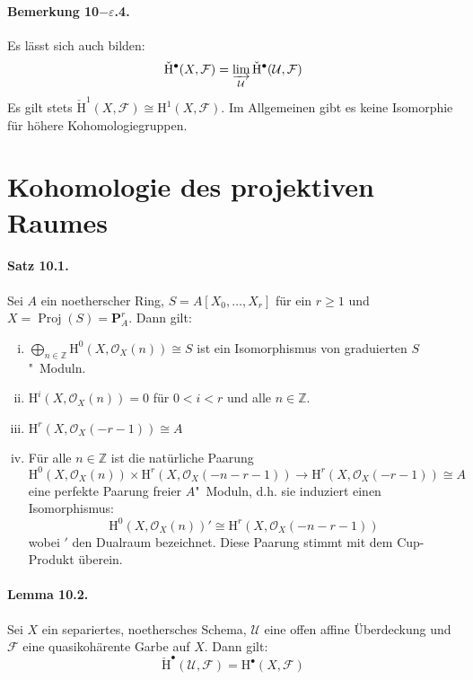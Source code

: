 \paragraph{Bemerkung 10$-\varepsilon$.4.}\label{9.5.4} Es lässt sich auch bilden:
\[\check{\mathrm{H}}^\bullet(X,\mathcal{F}) = \varinjlim_{\mathcal{U}}\check{\mathrm{H}}^\bullet(\mathcal{U},\mathcal{F}) \]
Es gilt stets $\check{\mathrm{H}}^1(X,\mathcal{F})\cong \mathrm{H}^1(X,\mathcal{F})$. Im Allgemeinen gibt es keine Isomorphie für höhere Kohomologiegruppen.

\section{Kohomologie des projektiven Raumes}

\paragraph{Satz 10.1.}\label{10.1} Sei $A$ ein noetherscher Ring, $S=A[X_0,\ldots,X_r]$ für ein $r\geq 1$ und $X=\operatorname{Proj}(S)=\mathbf{P}_A^r$. Dann gilt:
\begin{enumerate}[(i)]
\item $\bigoplus_{n\in\mathbb{Z}} \mathrm{H}^0(X,\mathcal{O}_X(n))\cong S$ ist ein Isomorphismus von graduierten $S$"~Moduln.
\item $\mathrm{H}^i(X,\mathcal{O}_X(n))=0$ für $0<i<r$ und alle $n\in\mathbb{Z}$.
\item $\mathrm{H}^r(X,\mathcal{O}_X(-r-1))\cong A$
\item Für alle $n\in\mathbb{Z}$ ist die natürliche Paarung
\[ \mathrm{H}^0(X,\mathcal{O}_X(n))\times\mathrm{H}^r(X,\mathcal{O}_X(-n-r-1))\to\mathrm{H}^r(X,\mathcal{O}_X(-r-1))\cong A \]
eine perfekte Paarung freier $A$"~Moduln, d.h. sie induziert einen Isomorphismus:
\[\mathrm{H}^0(X,\mathcal{O}_X(n))'\cong \mathrm{H}^r(X,\mathcal{O}_X(-n-r-1)) \]
wobei $'$ den Dualraum bezeichnet. Diese Paarung stimmt mit dem Cup-Produkt überein.
\end{enumerate}

\paragraph{Lemma 10.2.}\label{10.2} Sei $X$ ein separiertes, noethersches Schema, $\mathcal{U}$ eine offen affine Überdeckung und $\mathcal{F}$ eine quasikohärente Garbe auf $X$. Dann gilt:
\[\check{\mathrm{H}}^\bullet(\mathcal{U},\mathcal{F}) = \mathrm{H}^\bullet(X,\mathcal{F}) \]

